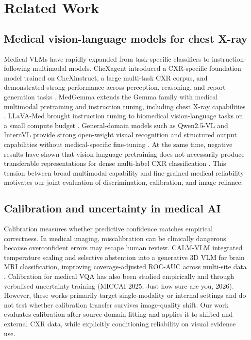 \section{Related Work}

\subsection{Medical vision-language models for chest X-ray}

Medical VLMs have rapidly expanded from task-specific classifiers to instruction-following multimodal models. CheXagent introduced a CXR-specific foundation model trained on CheXinstruct, a large multi-task CXR corpus, and demonstrated strong performance across perception, reasoning, and report-generation tasks \citep{chen2024chexagent}. MedGemma extends the Gemma family with medical multimodal pretraining and instruction tuning, including chest X-ray capabilities \citep{sellergren2025medgemma}. LLaVA-Med brought instruction tuning to biomedical vision-language tasks on a small compute budget \citep{li2024llavamed}. General-domain models such as Qwen2.5-VL and InternVL provide strong open-weight visual recognition and structured output capabilities without medical-specific fine-tuning \citep{bai2025qwen25vl}. At the same time, negative results have shown that vision-language pretraining does not necessarily produce transferable representations for dense multi-label CXR classification \citep{fisher2025negative}. This tension between broad multimodal capability and fine-grained medical reliability motivates our joint evaluation of discrimination, calibration, and image reliance.

\subsection{Calibration and uncertainty in medical AI}

Calibration measures whether predictive confidence matches empirical correctness. In medical imaging, miscalibration can be clinically dangerous because overconfident errors may escape human review. CALM-VLM integrated temperature scaling and selective abstention into a generative 3D VLM for brain MRI classification, improving coverage-adjusted ROC-AUC across multi-site data \citep{dhinagar2026calm}. Calibration for medical VQA has also been studied empirically and through verbalised uncertainty training (MICCAI 2025; Just how sure are you, 2026). However, these works primarily target single-modality or internal settings and do not test whether calibration transfer survives image-quality shift. Our work evaluates calibration after source-domain fitting and applies it to shifted and external CXR data, while explicitly conditioning reliability on visual evidence use.

